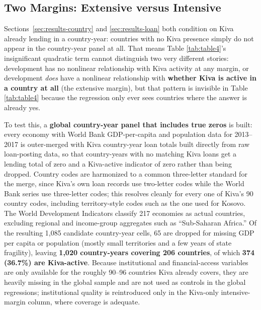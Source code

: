 \documentclass[12pt]{article}
\begin{document}




\subsection{Two Margins: Extensive versus Intensive}
\label{sec:results-extensive}

Sections~\ref{sec:results-country} and \ref{sec:results-loan} both condition on Kiva already lending
in a country-year: countries with no Kiva presence simply do not appear in the country-year panel at
all. That means Table \ref{tab:table4}'s insignificant quadratic term cannot distinguish two very
different stories: development has no nonlinear relationship with Kiva activity at any margin, or
development \emph{does} have a nonlinear relationship with \textbf{whether Kiva is active in a
country at all} (the extensive margin), but that pattern is invisible in Table \ref{tab:table4}
because the regression only ever sees countries where the answer is already yes.

To test this, a \textbf{global country-year panel that includes true zeros} is built: every economy
with World Bank GDP-per-capita and population data for 2013--2017 is outer-merged with Kiva
country-year loan totals built directly from raw loan-posting data, so that country-years with no
matching Kiva loans get a lending total of zero and a Kiva-active indicator of zero rather than being
dropped. Country codes are harmonized to a common three-letter standard for the merge, since Kiva's own
loan records use two-letter codes while the World Bank series use three-letter codes; this resolves
cleanly for every one of Kiva's 90 country codes, including territory-style codes such as the one used
for Kosovo. The World Development Indicators classify 217 economies as actual countries, excluding
regional and income-group aggregates such as ``Sub-Saharan Africa.'' Of the resulting 1,085 candidate
country-year cells, 65 are dropped for missing GDP per capita or population (mostly small territories
and a few years of state fragility), leaving \textbf{1,020 country-years covering 206 countries}, of
which \textbf{374 (36.7\%) are Kiva-active}.
Because institutional and financial-access variables are only available for the roughly 90--96
countries Kiva already covers, they are heavily missing in the global sample and are not used as
controls in the global regressions; institutional quality is reintroduced only in the Kiva-only
intensive-margin column, where coverage is adequate.
\end{document}
